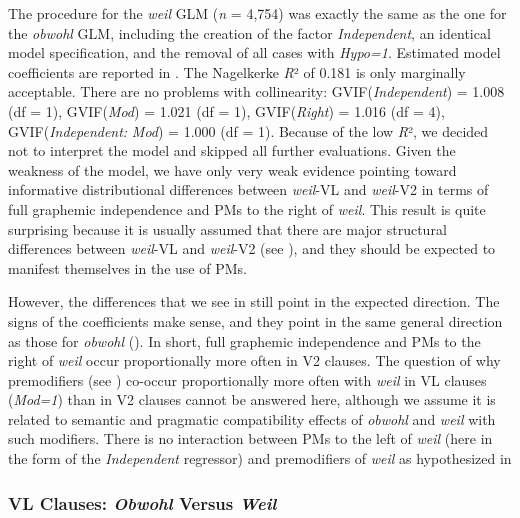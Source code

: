 The procedure for the \textit{weil} GLM (\textit{n} = 4,754) was exactly the same as the one for the \textit{obwohl} GLM, including the creation of the factor \textit{Independent}, an identical model specification, and the removal of all cases with \textit{Hypo=1}. Estimated model coefficients are reported in . The Nagelkerke \textit{R}² of 0.181 is only marginally acceptable. There are no problems with collinearity: GVIF(\textit{Independent}) = 1.008 (df = 1), GVIF(\textit{Mod}) = 1.021 (df = 1), GVIF(\textit{Right}) = 1.016 (df = 4), GVIF(\textit{Independent:} \textit{Mod}) = 1.000 (df = 1). Because of the low \textit{R}², we decided not to interpret the model and skipped all further evaluations. Given the weakness of the model, we have only very weak evidence pointing toward informative distributional differences between \textit{weil}{}-VL and \textit{weil}{}-V2 in terms of full graphemic independence and PMs to the right of \textit{weil}. This result is quite surprising because it is usually assumed that there are major structural differences between \textit{weil}{}-VL and \textit{weil}{}-V2 (see ), and they should be expected to manifest themselves in the use of PMs.





However, the differences that we see in  still point in the expected direction. The signs of the coefficients make sense, and they point in the same general direction as those for \textit{obwohl} (). In short, full graphemic independence and PMs to the right of \textit{weil} occur proportionally more often in V2 clauses. The question of why premodifiers (see ) co-occur proportionally more often with \textit{weil} in VL clauses (\textit{Mod=1}) than in V2 clauses cannot be answered here, although we assume it is related to semantic and pragmatic compatibility effects of \textit{obwohl} and \textit{weil} with such modifiers. There is no interaction between PMs to the left of \textit{weil} (here in the form of the \textit{Independent} regressor) and premodifiers of \textit{weil} as hypothesized in 



\subsubsection{VL Clauses: \textit{Obwohl} Versus \textit{Weil}}



